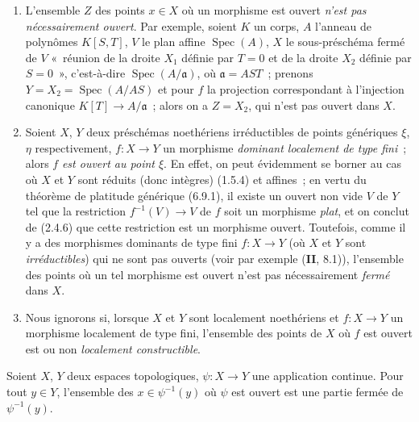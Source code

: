 \begin{remarks}[14.1.3]
\label{IV.14.1.3-fr}
\begin{enumerate}[label=(\roman*)]
  \item L'ensemble $Z$ des points $x\in X$ où un morphisme est ouvert
  \emph{n'est pas nécessairement ouvert}. Par exemple, soient $K$ un corps, $A$
  l'anneau de polynômes $K[S,T]$, $V$ le plan affine $\operatorname{Spec}(A)$,
  $X$ le sous-préschéma fermé de $V$ «~réunion de la droite $X_1$ définie par
  $T=0$ et de la droite $X_2$ définie par $S=0$~», c'est-à-dire
  $\operatorname{Spec}(A/\mathfrak a)$, où $\mathfrak a=AST$~; prenons
  $Y=X_2=\operatorname{Spec}(A/AS)$ et pour $f$ la projection correspondant à
  l'injection canonique $K[T]\to A/\mathfrak a$~; alors on a $Z=X_2$, qui n'est
  pas ouvert dans $X$.

  \item Soient $X$, $Y$ deux préschémas noethériens irréductibles de points
  génériques $\xi$, $\eta$ respectivement, $f:X\to Y$ un morphisme
  \emph{dominant localement de type fini}~; alors $f$ \emph{est ouvert au point
  $\xi$}. En effet, on peut évidemment se borner au cas où $X$ et $Y$ sont réduits
  (donc intègres) (1.5.4) et affines~; en vertu du théorème de platitude générique
  (6.9.1), il existe un ouvert non vide $V$ de $Y$ tel que la restriction
  $f^{-1}(V)\to V$ de $f$ soit un morphisme \emph{plat}, et on conclut de (2.4.6)
  que cette restriction est un morphisme ouvert. Toutefois, comme il y a des
  morphismes dominants de type fini $f:X\to Y$ (où $X$ et $Y$ sont
  \emph{irréductibles}) qui ne sont pas ouverts (voir par exemple (\textbf{II},
  8.1)), l'ensemble des points où un tel morphisme est ouvert n'est pas
  nécessairement \emph{fermé} dans $X$.

  \item Nous ignorons si, lorsque $X$ et $Y$ sont localement noethériens et
  $f:X\to Y$ un morphisme localement de type fini, l'ensemble des points de $X$
  où $f$ est ouvert est ou non \emph{localement constructible}.
\end{enumerate}
\end{remarks}

\begin{proposition}[14.1.4]
\label{IV.14.1.4-fr}
Soient $X$, $Y$ deux espaces topologiques, $\psi:X\to Y$ une application
continue. Pour tout $y\in Y$, l'ensemble des $x\in\psi^{-1}(y)$ où $\psi$ est
ouvert est une partie fermée de $\psi^{-1}(y)$.
\end{proposition}

